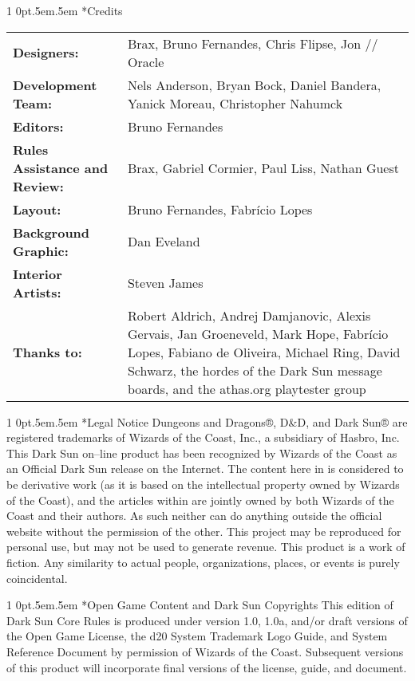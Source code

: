 \documentclass[onecolumn,oneside]{d20}
\makeatletter
\renewcommand\section{
  \@startsection{section}
  {1}
  {0pt}{.5em}{.5em}{\color{ChapterColor}\Large\scshape\raggedleft\imfellEnglish}
}
\makeatother
\begin{document}
\small
\section*{Credits}
\noindent\begin{tabularx}{\textwidth}{>{\bfseries}p{4cm} X}
  Designers: & Brax, Bruno Fernandes, Chris Flipse, Jon // Oracle \\
  Development Team: & Nels Anderson, Bryan Bock, Daniel Bandera, Yanick Moreau, Christopher Nahumck \\
  Editors: & Bruno Fernandes \\
  Rules Assistance and Review: & Brax, Gabriel Cormier, Paul Liss, Nathan Guest \\
  Layout: & Bruno Fernandes, Fabrício Lopes \\
  Background Graphic: & Dan Eveland \\
  Interior Artists: & Steven James \\
  Thanks to: & Robert Aldrich, Andrej Damjanovic, Alexis Gervais, Jan Groeneveld, Mark Hope, Fabrício Lopes, Fabiano de Oliveira, Michael Ring, David Schwarz, the hordes of the Dark Sun message boards, and the athas.org playtester group \\
\end{tabularx}

\section*{Legal Notice}
Dungeons and Dragons®, D\&D, and Dark Sun® are registered trademarks of Wizards of the Coast, Inc., a subsidiary of Hasbro, Inc. This Dark Sun on--line product has been recognized by Wizards of the Coast as an Official Dark Sun release on the Internet. The content here in is considered to be derivative work (as it is based on the intellectual property owned by Wizards of the Coast), and the articles within are jointly owned by both Wizards of the Coast and their authors. As such neither can do anything outside the official website without the permission of the other. This project may be reproduced for personal use, but may not be used to generate revenue. This product is a work of fiction. Any similarity to actual people, organizations, places, or events is purely coincidental.

\section*{Open Game Content and Dark Sun Copyrights}
This edition of Dark Sun Core Rules is produced under version 1.0, 1.0a, and/or draft versions of the Open Game License, the d20 System Trademark Logo Guide, and System Reference Document by permission of Wizards of the Coast. Subsequent versions of this product will incorporate final versions of the license, guide, and document.
\end{document}
